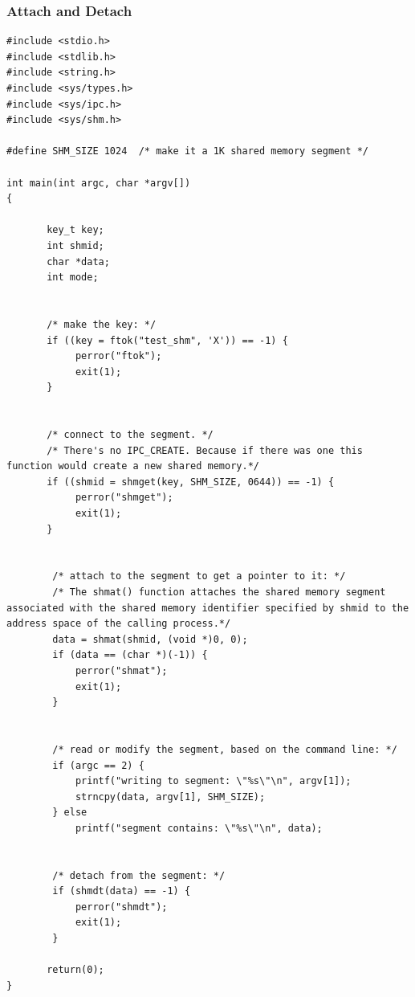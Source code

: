 \documentclass[12pt]{article}
\begin{document}
\subsubsection{Attach and Detach}
\begin{lstlisting}
#include <stdio.h>
#include <stdlib.h>
#include <string.h>
#include <sys/types.h>
#include <sys/ipc.h>
#include <sys/shm.h>

#define SHM_SIZE 1024  /* make it a 1K shared memory segment */

int main(int argc, char *argv[])
{

       key_t key;
       int shmid;
       char *data;
       int mode;


       /* make the key: */
       if ((key = ftok("test_shm", 'X')) == -1) {
            perror("ftok");
            exit(1);
       }


       /* connect to the segment. */
	   /* There's no IPC_CREATE. Because if there was one this function would create a new shared memory.*/
       if ((shmid = shmget(key, SHM_SIZE, 0644)) == -1) {
            perror("shmget");
            exit(1);
       }


	    /* attach to the segment to get a pointer to it: */
        /* The shmat() function attaches the shared memory segment associated with the shared memory identifier specified by shmid to the address space of the calling process.*/
        data = shmat(shmid, (void *)0, 0);
        if (data == (char *)(-1)) {
            perror("shmat");
            exit(1);
        }


        /* read or modify the segment, based on the command line: */
        if (argc == 2) {
            printf("writing to segment: \"%s\"\n", argv[1]);
            strncpy(data, argv[1], SHM_SIZE);
        } else
            printf("segment contains: \"%s\"\n", data);


        /* detach from the segment: */
        if (shmdt(data) == -1) {
            perror("shmdt");
            exit(1);
        }

       return(0);
}
\end{lstlisting}
\end{document}
